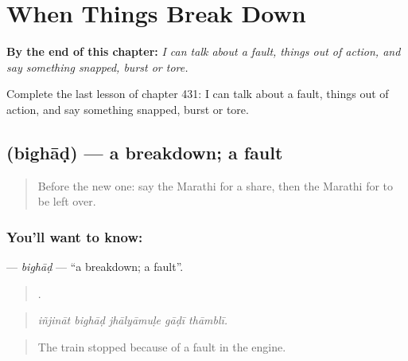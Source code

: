 
\chapter{When Things Break Down}
\label{ch:mr-when-things-break-down}

\begin{chapteropening}
\textbf{By the end of this chapter:} \emph{I can talk about a fault, things out of action, and say something snapped, burst or tore.}

Complete the last lesson of chapter 431: I can talk about a fault, things out of action, and say something snapped, burst or tore.
\end{chapteropening}

\section[\texorpdfstring{\mr{बिघाड} (bighāḍ)}{बिघाड (bighāḍ)}]{ (bighāḍ) — a breakdown; a fault}

\label{lesson:MR-C431-bighad}



\begin{quote}
Before the new one: say the Marathi for a share, then the Marathi for to be left over.
\end{quote}

\subsection*{You'll want to know: }
\textbf{} — \emph{bighāḍ} — \textquotedblleft{}a breakdown; a fault\textquotedblright{}.

\begin{quote}
    .
\end{quote}

\begin{quote}
\emph{iñjināt bighāḍ jhālyāmuḷe gāḍī thāmblī.}
\end{quote}

\begin{quote}
The train stopped because of a fault in the engine.
\end{quote}

